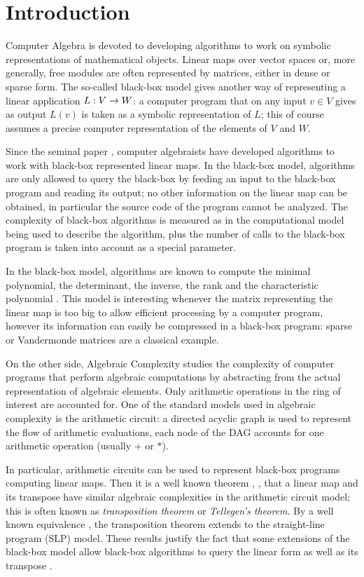 \section{Introduction}
\label{sec:introduction}

Computer Algebra is devoted to developing algorithms to work on
symbolic representations of mathematical objects. Linear maps over
vector spaces or, more generally, free modules are often represented
by matrices, either in dense or sparse form.  The so-called black-box
model gives another way of representing a linear application $L:V\rightarrow
W$: a computer program that on any input $v\in V$ gives as output
$L(v)$ is taken as a symbolic representation of $L$; this of course
assumes a precise computer representation of the elements of $V$ and
$W$.

Since the seminal paper \cite{wiedemann:sparse}, computer algebraists
have developed algorithms to work with black-box represented linear
maps.  In the black-box model, algorithms are only allowed to query
the black-box by feeding an input to the black-box program and reading
its output; no other information on the linear map can be obtained, in
particular the source code of the program cannot be analyzed. The
complexity of black-box algorithms is measured as in the computational
model being used to describe the algorithm, plus the number of calls
to the black-box program is taken into account as a special parameter.

In the black-box model, algorithms are known to compute the minimal
polynomial, the determinant, the inverse, the rank \cite{Wie86,KaSa91}
and the characteristic polynomial \cite{Ebe00,Vil00,DPS09}.  This
model is interesting whenever the matrix representing the linear map
is too big to allow efficient processing by a computer program,
however its information can easily be compressed in a black-box
program: sparse or Vandermonde matrices are a classical example.

On the other side, Algebraic Complexity studies the complexity of
computer programs that perform algebraic computations by abstracting
from the actual representation of algebraic elements. Only arithmetic
operations in the ring of interest are accounted for. One of the
standard models used in algebraic complexity is the arithmetic
circuit: a directed acyclic graph is used to represent the flow of
arithmetic evaluations, each node of the DAG accounts for one
arithmetic operation (usually $+$ or $*$).

In particular, arithmetic circuits can be used to represent black-box
programs computing linear maps. Then it is a well known theorem
\cite{Bor56}, \cite{Fid73}, \cite[Th. 13.20]{BuClSh} that a linear map
and its transpose have similar algebraic complexities in the
arithmetic circuit model; this is often known as \emph{transposition
  theorem} or \emph{Tellegen's theorem}. By a well known equivalence
\cite[Lemma 13.17]{BuClSh}, the transposition theorem extends to the
straight-line program (SLP) model. These results justify the fact that
some extensions of the black-box model allow black-box algorithms to
query the linear form as well as its transpose \cite{}.

